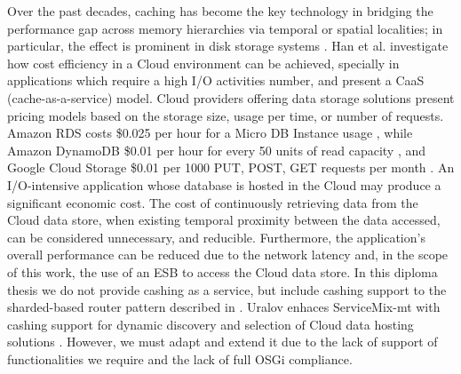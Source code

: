 Over the past decades, caching has become the key technology in bridging the performance gap across memory hierarchies via temporal or spatial localities; in particular, the effect is prominent in disk storage systems \cite{cashing2012}. Han et al. investigate how cost efficiency in a Cloud environment can be achieved, specially in applications which require a high I/O activities number, and present a CaaS (cache-as-a-service) model. Cloud providers offering data storage solutions present pricing models based on the storage size, usage per time, or number of requests. Amazon RDS costs \$0.025 per hour for a Micro DB Instance usage  \cite{amazonrds}, while Amazon DynamoDB \$0.01 per hour for every 50 units of read capacity \cite{amazondynamodb}, and Google Cloud Storage \$0.01 per 1000 PUT, POST, GET requests per month \cite{googlecloudstorage}. An I/O-intensive application whose database is hosted in the Cloud may produce a significant economic cost. The cost of continuously retrieving data from the Cloud data store, when existing temporal proximity between the data accessed, can be considered unnecessary, and reducible. Furthermore, the application's overall performance can be reduced due to the network latency and, in the scope of this work, the use of an \ac{ESB} to access the Cloud data store. In this diploma thesis we do not provide cashing as a service, but include cashing support to the sharded-based router pattern described in \cite{strauchABKL2012}. Uralov enhaces ServiceMix-mt with cashing support for dynamic discovery and selection of Cloud data hosting solutions \cite{Uralov2012}. However, we must adapt and extend it due to the lack of support of functionalities we require and the lack of full \ac{OSGi} compliance. 






\clearpage  